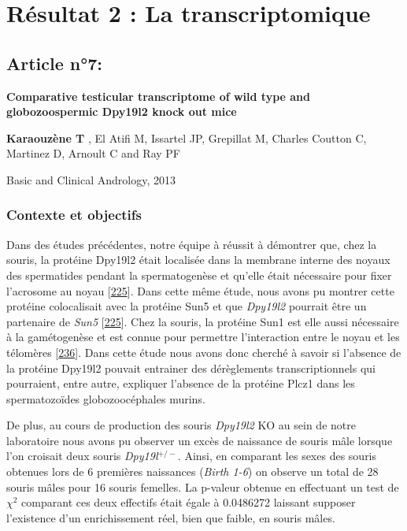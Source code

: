 \documentclass[12pt,a4paper,twoside]{ugathesis}
\theoremstyle{definition}
\theoremstyle{definition}
\theoremstyle{definition}
\theoremstyle{remark}
\begin{document}
\newpage

\section{Résultat 2 : La transcriptomique}\label{transcriptome}

\subsection{Article n°7:}\label{article-n7}

\textbf{Comparative testicular transcriptome of wild type and
globozoospermic Dpy19l2 knock out mice}

\textbf{Karaouzène T} , El Atifi M, Issartel JP, Grepillat M, Charles
Coutton C, Martinez D, Arnoult C and Ray PF

Basic and Clinical Andrology, 2013

\newpage

\subsubsection{Contexte et objectifs}\label{contexte-et-objectifs-6}

Dans des études précédentes, notre équipe à réussit à démontrer que,
chez la souris, la protéine Dpy19l2 était localisée dans la membrane
interne des noyaux des spermatides pendant la spermatogenèse et qu'elle
était nécessaire pour fixer l'acrosome au noyau
{[}\protect\hyperlink{ref-Pierre2012}{225}{]}. Dans cette même étude,
nous avons pu montrer cette protéine colocalisait avec la protéine Sun5
et que \emph{Dpy19l2} pourrait être un partenaire de \emph{Sun5}
{[}\protect\hyperlink{ref-Pierre2012}{225}{]}. Chez la souris, la
protéine Sun1 est elle aussi nécessaire à la gamétogenèse et est connue
pour permettre l'interaction entre le noyau et les télomères
{[}\protect\hyperlink{ref-Ding2007}{236}{]}. Dans cette étude nous avons
donc cherché à savoir si l'absence de la protéine Dpy19l2 pouvait
entrainer des dérèglements transcriptionnels qui pourraient, entre
autre, expliquer l'absence de la protéine Plcz1 dans les spermatozoïdes
globozoocéphales murins.

De plus, au cours de production des souris \emph{Dpy19l2} KO au sein de
notre laboratoire nous avons pu observer un excès de naissance de souris
mâle lorsque l'on croisait deux souris \emph{Dpy19l}\(^{+/-}\). Ainsi,
en comparant les sexes des souris obtenues lors de 6 premières
naissances (\emph{Birth 1-6}) on observe un total de 28 souris mâles
pour 16 souris femelles. La p-valeur obtenue en effectuant un test de
\(\chi^2\) comparant ces deux effectifs était égale à 0.0486272 laissant
supposer l'existence d'un enrichissement réel, bien que faible, en
souris mâles.
\end{document}

